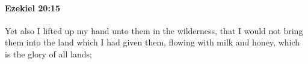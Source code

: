 
		\paragraph{Ezekiel 20:15} %
			\label{EZEKIEL-20-15}

			Yet also I lifted up my hand unto them in the wilderness, that I would not bring them into the land which I had given them, flowing with milk and honey, which is the glory of all lands;


